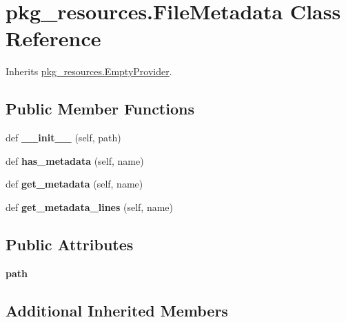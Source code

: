 \hypertarget{classpkg__resources_1_1_file_metadata}{}\section{pkg\+\_\+resources.\+File\+Metadata Class Reference}
\label{classpkg__resources_1_1_file_metadata}


Inherits \hyperlink{classpkg__resources_1_1_empty_provider}{pkg\+\_\+resources.\+Empty\+Provider}.

\subsection*{Public Member Functions}
\begin{DoxyCompactItemize}
\item 
\mbox{\label{classpkg__resources_1_1_file_metadata_a038dfeba0ff764aa85e69708d248e476}} 
def {\bfseries \+\_\+\+\_\+init\+\_\+\+\_\+} (self, path)
\item 
\mbox{\label{classpkg__resources_1_1_file_metadata_a369b72f554a1c35205959814237cb06d}} 
def {\bfseries has\+\_\+metadata} (self, name)
\item 
\mbox{\label{classpkg__resources_1_1_file_metadata_a4a047f462c972090a3d31882f65bb957}} 
def {\bfseries get\+\_\+metadata} (self, name)
\item 
\mbox{\label{classpkg__resources_1_1_file_metadata_a493e91a4a2a75d0b3600ad9f52a148cb}} 
def {\bfseries get\+\_\+metadata\+\_\+lines} (self, name)
\end{DoxyCompactItemize}
\subsection*{Public Attributes}
\begin{DoxyCompactItemize}
\item 
\mbox{\label{classpkg__resources_1_1_file_metadata_a2855060a8b7e183c33be0b709c9288c7}} 
{\bfseries path}
\end{DoxyCompactItemize}
\subsection*{Additional Inherited Members}


